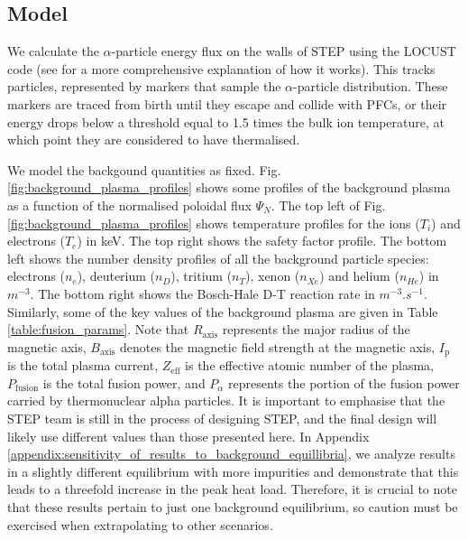 \documentclass[10pt, a4paper, twoside]{article}
\begin{document}
\subsection{Model}
\label{sec:model}

We calculate the $\alpha$-particle energy flux on the walls of STEP using the LOCUST code (see \cite{akers2018, ward2021} for a more comprehensive explanation of how it works). This tracks particles, represented by markers that sample the $\alpha$-particle distribution. These markers are traced from birth until they escape and collide with PFCs, or their energy drops below a threshold equal to 1.5 times the bulk ion temperature, at which point they are considered to have thermalised. 

We model the backgound quantities as fixed. Fig. \ref{fig:background_plasma_profiles} shows some profiles of the background plasma as a function of the normalised poloidal flux $\Psi_N$. 
The top left of Fig. \ref{fig:background_plasma_profiles} shows temperature profiles for the ions ($T_i$) and electrons ($T_e$) in keV. 
The top right shows the safety factor profile. 
The bottom left shows the number density profiles of all the background particle species: electrons ($n_e$), deuterium ($n_D$), tritium ($n_T$), xenon ($n_{Xe}$) and helium ($n_{He}$) in $\si{m^{-3}}$. 
The bottom right shows the Bosch-Hale D-T reaction rate \cite{bosch1992} in $\si{m^{-3}.s^{-1}}$. 
Similarly, some of the key values of the background plasma are given in Table \ref{table:fusion_params}. Note that  $R_{\text{axis}}$ represents the major radius of the magnetic axis, $B_{\text{axis}}$ denotes the magnetic field strength at the magnetic axis, $I_{\text{p}}$ is the total plasma current, $Z_{\text{eff}}$ is the effective atomic number of the plasma, $P_{\text{fusion}}$ is the total fusion power, and $P_{\alpha}$ represents the portion of the fusion power carried by thermonuclear alpha particles.
It is important to emphasise that the STEP team is still in the process of designing STEP, and the final design will likely use different values than those presented here. In Appendix \ref{appendix:sensitivity_of_results_to_background_equillibria}, we analyze results in a slightly different equilibrium with more impurities and demonstrate that this leads to a threefold increase in the peak heat load. Therefore, it is crucial to note that these results pertain to just one background equilibrium, so caution must be exercised when extrapolating to other scenarios.
\end{document}
